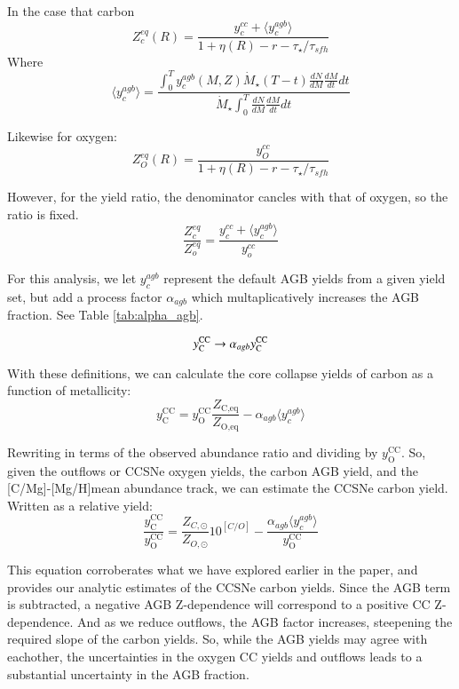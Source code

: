 \documentclass[12pt,oneside]{book}
\newcommand{\caah}{[C/Mg]-[Mg/H]}
\newcommand{\sun}{\ensuremath{\odot}}
\begin{document}
In the case that carbon
\begin{equation}
Z_c^{eq}(R) = \frac{y_c^{cc} + \langle y_c^{agb} \rangle }{1 + \eta(R) - r - \tau_\star / \tau_{sfh}}
\end{equation}Where
\begin{equation}
\langle y_c^{agb} \rangle = \frac{\int_0^T y_c^{agb}(M, Z) \dot{M}_\star(T - t) \frac{dN}{dM} \frac{dM}{dt} dt  }{ \dot{M}_\star \int_0^T \frac{dN}{dM} \frac{dM}{dt} dt}
\end{equation}

Likewise for oxygen:
\begin{equation}
Z_O^{eq}(R) = \frac{y_O^{cc}}{1 + \eta(R) - r - \tau_\star / \tau_{sfh}}
\end{equation}

However, for the yield ratio, the denominator cancles with that of oxygen, so the ratio is fixed.
\begin{equation}
\frac{Z_c^{eq}}{Z_o^{eq}} = \frac{y_c^{cc} + \langle y_c^{agb} \rangle }{y_o^{cc}}
\end{equation}

For this analysis, we let $y_c^{agb}$ represent the default AGB yields from a given yield set, but add a process factor $\alpha_{agb}$ which multaplicatively increases the AGB fraction. See Table \ref{tab:alpha_agb}.

\begin{equation}
    y_{\rm C}^{\rm CC} \rightarrow \alpha_{agb}  y_{\rm C}^{\rm CC}
\end{equation}

With these definitions, we can calculate the core collapse yields of carbon as a function of metallicity:
\begin{equation}
    y_\text{C}^\text{CC} =  y_\text{O}^\text{CC} \frac{Z_\text{C,eq}}{Z_\text{O,eq}} - \alpha_{agb} \langle y_c^{agb} \rangle
\end{equation}

Rewriting in terms of the observed abundance ratio and dividing by
$y_\text{O}^\text{CC}$. So, given the outflows or CCSNe oxygen yields, the
carbon AGB yield, and the \caah mean abundance track, we can estimate the CCSNe carbon yield. Written as a relative yield:
\begin{equation}
    \frac{y_\text{C}^\text{CC}}{y_\text{O}^\text{CC}} = \frac{Z_{C, \sun}}{Z_{O, \sun}} 10^{[C/O]} - \frac{\alpha_{agb} \langle y_c^{agb} \rangle}{ y_\text{O}^\text{CC}}
\end{equation}

This equation corroberates what we have explored earlier in the paper, and provides our analytic estimates of the CCSNe carbon yields. Since the AGB term is subtracted, a negative AGB Z-dependence will correspond to a positive CC Z-dependence. And as we reduce outflows, the AGB factor increases, steepening the required slope of the carbon yields. So, while the AGB yields may agree with eachother, the uncertainties in the oxygen CC yields and outflows leads to a substantial uncertainty in the AGB fraction.  
\end{document}
